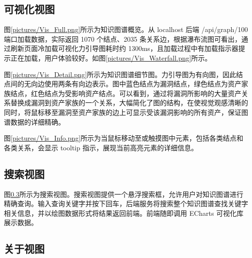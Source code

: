 \documentclass[a4paper,AutoFakeBold,oneside,12pt]{book}
\begin{document}

\subsection{可视化视图}

图\ref{pictures/Vis_Full.png}所示为知识图谱概览。从 localhost 后端 /api/graph/100 端口加载数据，实际返回 1070 个结点、2035 条关系边，根据瀑布流图可看出，通过刷新页面冷加载可视化力引导图耗时约 1300ms，且加载过程中有加载指示器提示正在加载，用户体验较好。如图\ref{pictures/Vis_Waterfall.png}所示。



图\ref{pictures/Vis_Detail.png}所示为知识图谱细节图。力引导图为有向图，因此结点间的无向边使用两条有向边表示。图中蓝色结点为漏洞结点，绿色结点为资产家族结点，红色结点为受影响资产结点。可以看到，通过将漏洞所影响的大量资产关系替换成漏洞到资产家族的一个关系，大幅简化了图的结构，在使视觉观感清晰的同时，将鼠标移至漏洞至资产家族的边上可显示受该漏洞影响的所有资产，保证图谱数据的详细精确。


图\ref{pictures/Vis_Info.png}所示为当鼠标移动至或触摸图中元素，包括各类结点和各类关系，会显示 tooltip 指示，展现当前高亮元素的详细信息。


\subsection{搜索视图}

图\ref{}所示为搜索视图。搜索视图提供一个悬浮搜索框，允许用户对知识图谱进行精确查询。输入查询关键字并按下回车，后端服务将搜索整个知识图谱查找关键字相关信息，并以绘图数据形式将结果返回前端。前端随即调用 ECharts 可视化库展示数据。


\subsection{关于视图}
\end{document}
